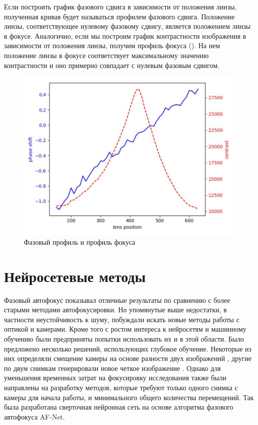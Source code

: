 Если построить график фазового сдвига в зависимости от положения линзы, полученная кривая будет называться профилем фазового сдвига. Положение линзы, соответствующее нулевому фазовому сдвигу, является положением линзы в фокусе. Аналогично, если мы построим график контрастности изображения в зависимости от положения линзы, получим профиль фокуса (). На нем положение линзы в фокусе соответствует максимальному значению контрастности и оно примерно совпадает с нулевым фазовым сдвигом.

\begin{figure}[ht!] 
	\center
	\includegraphics [scale=0.7] {my_folder/images/phase_profile.png}
	\caption{Фазовый профиль и профиль фокуса}
	\label{fig:phse_profile}
\end{figure}

\section{Нейросетевые методы} \label{ch1:sec2} 
Фазовый автофокус показывал отличные результаты по сравнению с более старыми методами автофокусировки. Но упомянутые выше недостатки, в частности неустойчивость к шуму, побуждали искать новые методы работы с оптикой и камерами. Кроме того с ростом интереса к нейросетям и машинному обучению были предприняты попытки использовать их и в этой области. Было предложено несколько решений, использующих глубокое обучение. Некоторые из них определяли смещение камеры на основе разности двух изображений \cite{RaiDastidar}, другие по двум снимкам генерировали новое четкое изображение \cite{li2020rapid}. Однако для уменьшения временных затрат на фокусировку исследования также были направлены на разработку методов, которые требуют только одного снимка с камеры для начала работы, и минимального общего количества перемещений. Так была разработана сверточная нейронная сеть на основе алгоритма фазового автофокуса AF-Net.

